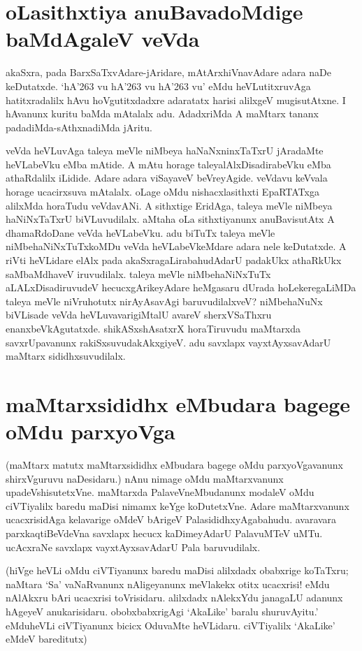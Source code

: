 \section*{oLasithxtiya anuBavadoMdige baMdAgaleV veVda}

akaSxra, pada BarxSaTxvAdare-jAridare, mAtArxhiVnavAdare adara naDe keDutatxde. `hA\char'263 vu hA\char'263 vu hA\char'263 vu' eMdu heVLutitxruvAga hatitxradalilx hAvu hoVgutitxdadxre adaratatx harisi alilxgeV mugisutAtxne. I hAvanunx kuritu baMda mAtalalx adu. AdadxriMda A maMtarx tananx padadiMda-sAthxnadiMda jAritu.

veVda heVLuvAga taleya meVle niMbeya haNaNxninxTaTxrU jAradaMte heVLabeVku eMba mAtide. A mAtu horage taleyalAlxDisadirabeVku eMba athaRdalilx iLidide. Adare adara viSayaveV beVreyAgide. veVdavu keVvala horage ucacirxsuva mAtalalx. oLage oMdu nishacxlasithxti EpaRTATxga alilxMda horaTudu veVdavANi. A sithxtige EridAga, taleya meVle niMbeya haNiNxTaTxrU biVLuvudilalx. aMtaha oLa sithxtiyanunx anuBavisutAtx A dhamaRdoDane veVda heVLabeVku. adu biTuTx taleya meVle niMbehaNiNxTuTxkoMDu veVda heVLabeVkeMdare adara nele keDutatxde. A riVti heVLidare elAlx pada akaSxragaLirabahudAdarU padakUkx athaRkUkx saMbaMdhaveV iruvudilalx. taleya meVle niMbehaNiNxTuTx aLALxDisadiruvudeV hecucxgArikeyAdare heMgasaru dUrada hoLekeregaLiMDa taleya meVle niVruhotutx nirAyAsavAgi baruvudilalxveV? niMbehaNuNx biVLisade veVda heVLuvavarigiMtalU avareV sherxVSaThxru enanxbeVkAgutatxde. shikASxshAsatxrX horaTiruvudu maMtarxda savxrUpavanunx rakiSxsuvudakAkxgiyeV. adu savxlapx vayxtAyxsavAdarU maMtarx sididhxsuvudilalx.

\section*{maMtarxsididhx eMbudara bagege oMdu parxyoVga}

(maMtarx matutx maMtarxsididhx eMbudara bagege oMdu parxyoVgavanunx  shirxVguruvu naDesidaru.) nAnu nimage oMdu maMtarxvanunx upadeVshisutetxVne. maMtarxda PalaveVneMbudanunx modaleV oMdu ciVTiyalilx baredu maDisi nimamx keYge koDutetxVne. Adare maMtarxvanunx ucacxrisidAga kelavarige oMdeV bArigeV PalasididhxyAgabahudu. avaravara parxkaqtiBeVdeVna savxlapx hecucx kaDimeyAdarU PalavuMTeV uMTu. ucAcxraNe savxlapx vayxtAyxsavAdarU Pala baruvudilalx.

(hiVge heVLi oMdu ciVTiyanunx baredu maDisi alilxdadx obabxrige koTaTxru; naMtara `Sa' vaNaRvanunx nAligeyanunx meVlakekx  otitx ucacxrisi! eMdu nAlAkxru bAri ucacxrisi toVrisidaru. alilxdadx nAlekxYdu janagaLU adanunx hAgeyeV anukarisidaru. obobxbabxrigAgi `AkaLike' baralu shuruvAyitu.' eMduheVLi ciVTiyanunx bicicx OduvaMte heVLidaru. ciVTiyalilx `AkaLike' eMdeV bareditutx)


